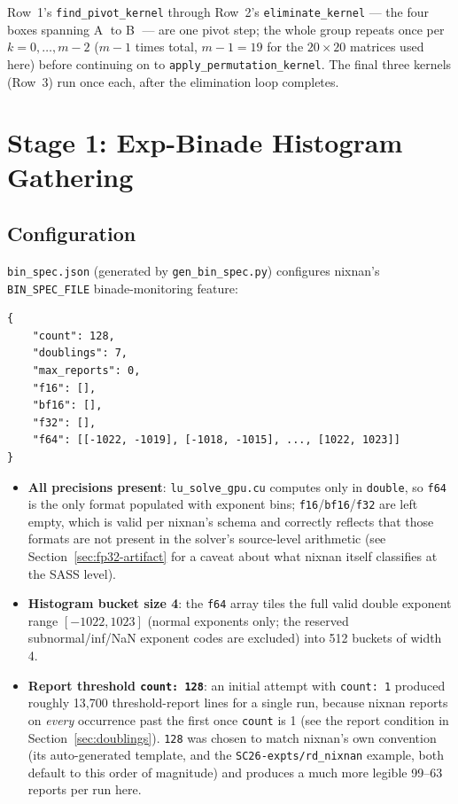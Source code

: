 \documentclass[11pt,a4paper]{article}
\begin{document}
\noindent Row~1's \texttt{find\_pivot\_kernel} through Row~2's
\texttt{eliminate\_kernel} --- the four boxes spanning
\textcircled{\scriptsize A} to \textcircled{\scriptsize B} --- are one pivot
step; the whole group repeats once per $k = 0, \dots, m{-}2$ ($m{-}1$ times
total, $m{-}1{=}19$ for the $20\times20$ matrices used here) before
continuing on to \texttt{apply\_permutation\_kernel}. The final three
kernels (Row~3) run once each, after the elimination loop completes.

\section{Stage 1: Exp-Binade Histogram Gathering}
\label{sec:binade}

\subsection{Configuration}

\texttt{bin\_spec.json} (generated by \texttt{gen\_bin\_spec.py}) configures
nixnan's \texttt{BIN\_SPEC\_FILE} binade-monitoring feature:

\begin{lstlisting}
{
    "count": 128,
    "doublings": 7,
    "max_reports": 0,
    "f16": [],
    "bf16": [],
    "f32": [],
    "f64": [[-1022, -1019], [-1018, -1015], ..., [1022, 1023]]
}
\end{lstlisting}

\begin{itemize}
  \item \textbf{All precisions present}: \texttt{lu\_solve\_gpu.cu} computes
    only in \texttt{double}, so \texttt{f64} is the only format populated
    with exponent bins; \texttt{f16}/\texttt{bf16}/\texttt{f32} are left
    empty, which is valid per nixnan's schema and correctly reflects that
    those formats are not present in the solver's source-level arithmetic
    (see Section~\ref{sec:fp32-artifact} for a caveat about what nixnan
    itself classifies at the SASS level).
  \item \textbf{Histogram bucket size 4}: the \texttt{f64} array tiles the
    full valid double exponent range $[-1022, 1023]$ (normal exponents
    only; the reserved subnormal/inf/NaN exponent codes are excluded) into
    512 buckets of width 4.
  \item \textbf{Report threshold \texttt{count: 128}}: an initial attempt
    with \texttt{count: 1} produced roughly 13{,}700 threshold-report lines
    for a single run, because nixnan reports on \emph{every} occurrence past
    the first once \texttt{count} is 1 (see the report condition in
    Section~\ref{sec:doublings}). \texttt{128} was chosen to match nixnan's
    own convention (its auto-generated template, and the
    \texttt{SC26-expts/rd\_nixnan} example, both default to this order of
    magnitude) and produces a much more legible 99--63 reports per run here.
\end{itemize}
\end{document}
